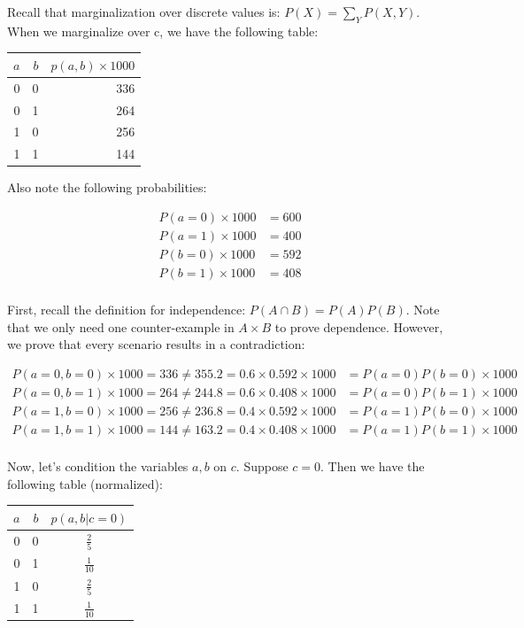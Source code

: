 \documentclass{article}
\begin{document}
Recall that marginalization over discrete values is: $ P(X) = \sum_Y P(X, Y) $. 
When we marginalize over c, we have the following table:

\begin{tabular}{r r | r }
	$a$ & $b$ & $p(a, b) \times 1000 $\\
	\hline
	0 & 0 & 336 \\
	0 & 1 & 264 \\
	1 & 0 & 256 \\
	1 & 1 & 144 \\
\end{tabular}

Also note the following probabilities:

\begin{align*}
    P(a = 0) \times 1000 &= 600 \\
    P(a = 1) \times 1000 &= 400 \\
    P(b = 0) \times 1000 &= 592 \\
    P(b = 1) \times 1000 &= 408 \\
\end{align*}

First, recall the definition for independence: $ P(A \cap B) = P(A) P(B) $.
Note that we only need one counter-example in $ A \times B $ to prove 
dependence. However, we prove that every scenario results in a contradiction:

\begin{align*}
    P(a = 0, b = 0) \times 1000 = 336 \ne 355.2 = 0.6 \times 0.592 \times 1000 &= P(a = 0) P(b = 0) \times 1000 \\
    P(a = 0, b = 1) \times 1000 = 264 \ne 244.8 = 0.6 \times 0.408 \times 1000 &= P(a = 0) P(b = 1) \times 1000 \\
    P(a = 1, b = 0) \times 1000 = 256 \ne 236.8 = 0.4 \times 0.592 \times 1000 &= P(a = 1) P(b = 0) \times 1000 \\
    P(a = 1, b = 1) \times 1000 = 144 \ne 163.2 = 0.4 \times 0.408 \times 1000 &= P(a = 1) P(b = 1) \times 1000 \\
\end{align*}

Now, let's condition the variables $ a, b $ on $ c $. Suppose $ c = 0 $. Then 
we have the following table (normalized):

\begin{tabular}{r r | c }
	$a$ & $b$ & $p(a, b | c = 0) $\\
	\hline
	0 & 0 & $ \frac{2}{5} $ \\
	0 & 1 & $ \frac{1}{10} $ \\
	1 & 0 & $ \frac{2}{5} $ \\
	1 & 1 & $ \frac{1}{10} $ \\
\end{tabular}
\end{document}
